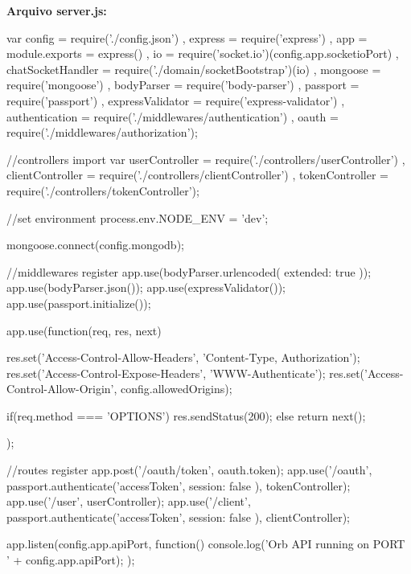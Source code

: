 \begin{flushleft}
\textbf{Arquivo server.js:}

var config = require('./config.json')
, express = require('express')
, app = module.exports = express()
, io = require('socket.io')(config.app.socketioPort)
, chatSocketHandler = require('./domain/socketBootstrap')(io)
, mongoose = require('mongoose')
, bodyParser = require('body-parser')
, passport = require('passport')
, expressValidator = require('express-validator')
, authentication = require('./middlewares/authentication')
, oauth = require('./middlewares/authorization');

//controllers import
var userController = require('./controllers/userController')
, clientController = require('./controllers/clientController')
, tokenController = require('./controllers/tokenController');

//set environment
process.env.NODE\_ENV = 'dev';

mongoose.connect(config.mongodb);

//middlewares register
app.use(bodyParser.urlencoded({ extended: true }));
app.use(bodyParser.json());
app.use(expressValidator());
app.use(passport.initialize());

app.use(function(req, res, next) {
	res.set('Access-Control-Allow-Headers', 'Content-Type, Authorization');
	res.set('Access-Control-Expose-Headers', 'WWW-Authenticate');
	res.set('Access-Control-Allow-Origin', config.allowedOrigins);
	
	if(req.method === 'OPTIONS')
	res.sendStatus(200);
	else
	return next();
	
});

//routes register
app.post('/oauth/token', oauth.token);
app.use('/oauth', passport.authenticate('accessToken', { session: false }), tokenController);
app.use('/user', userController);
app.use('/client', passport.authenticate('accessToken', { session: false }), clientController);

app.listen(config.app.apiPort, function(){
	console.log('Orb API running on PORT ' + config.app.apiPort);
});
\end{flushleft}

